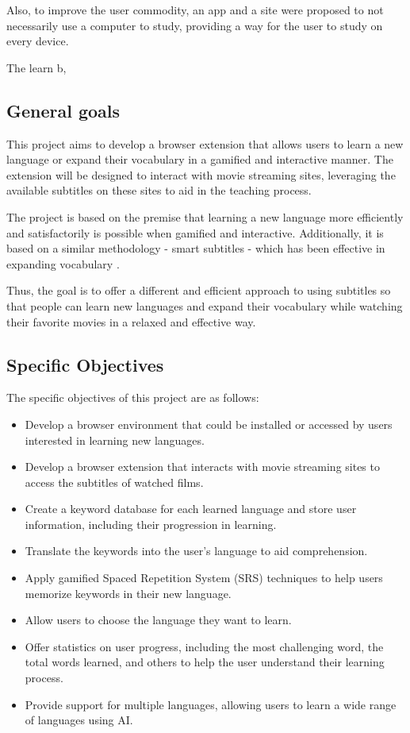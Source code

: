 \documentclass[12pt]{article}
\begin{document}
Also, to improve the user commodity, an app and a site were proposed to not necessarily use a computer to study, providing a way for the user to study on every device.


The learn b\cite{10.1145/2939672.2939850}, \cite{10.1145/3534678.3539081}

\subsection{General goals}

This project aims to develop a browser extension that allows users to learn a new language or expand their vocabulary in a gamified and interactive manner. The extension will be designed to interact with movie streaming sites, leveraging the available subtitles on these sites to aid in the teaching process.

The project is based on the premise that learning a new language more efficiently and satisfactorily is possible when gamified and interactive. Additionally, it is based on a similar methodology - smart subtitles - which has been effective in expanding vocabulary \cite{Kovacs14}.

Thus, the goal is to offer a different and efficient approach to using subtitles so that people can learn new languages and expand their vocabulary while watching their favorite movies in a relaxed and effective way.
\subsection{Specific Objectives}

The specific objectives of this project are as follows:

\begin{itemize}
\item Develop a browser environment that could be installed or accessed by users interested in learning new languages.
\item Develop a browser extension that interacts with movie streaming sites to access the subtitles of watched films.
\item Create a keyword database for each learned language and store user information, including their progression in learning.
\item Translate the keywords into the user's language to aid comprehension.
\item Apply gamified Spaced Repetition System (SRS) techniques to help users memorize keywords in their new language.
\item Allow users to choose the language they want to learn.
\item Offer statistics on user progress, including the most challenging word, the total words learned, and others to help the user understand their learning process.
\item Provide support for multiple languages, allowing users to learn a wide range of languages using AI.
\end{itemize}
\end{document}
